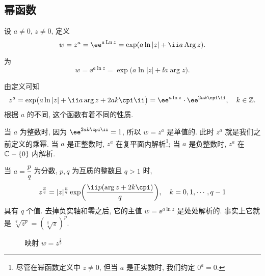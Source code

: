 \subsection{幂函数}
\label{ssec:power-function}

\begin{definition}
  \begin{enuma}
    \item 设 $a\neq 0$, $z\neq 0$, 定义
      \[
        w=z^a=\ee^{a\Ln z}
        =\exp(a\ln|z|+\ii a\Arg z).
      \]
    \item {}为
      \[
        w=\ee^{a\ln z}=\exp\bigl(a\ln|z|+\ii a\arg z\bigr).
      \]
  \end{enuma}
\end{definition}

由定义可知
\[
   z^a
  =\exp\bigl(a\ln|z|+\ii a\arg z+2ak\cpi\ii\bigr)
  =\ee^{a\ln z}\cdot \ee^{2ak\cpi\ii},
    \quad k\in\BZ.
\]
根据 $a$ 的不同, 这个函数有着不同的性质.

当 $a$ 为整数时, 因为 $\ee^{2ak\cpi\ii}=1$, 所以 $w=z^a$ 是单值的. 此时 $z^a$ 就是我们之前定义的乘幂. 
当 $a$ 是正整数时, $z^a$ 在复平面内解析\footnote{%
  尽管在幂函数定义中 $z\neq 0$, 但当 $a$ 是正实数时, 我们约定 $0^a=0$.
};
当 $a$ 是负整数时, $z^a$ 在 ${\mathbb{C}}-{\left\{0\right\}}$ 内解析.

当 $a=\dfrac pq$ 为分数, $p,q$ 为互质的整数且 $q>1$ 时,
\[
   z^{\frac pq}
  =|z|^{\frac pq}\exp\biggl(\frac{\ii p(\arg z+2k\cpi)}q\biggr),
    \quad k=0,1,\cdots,q-1
\]
具有 $q$ 个值.
去掉负实轴和零之后, 它的主值 $w=\ee^{a\ln z}$ 是处处解析的.
事实上它就是 $\sqrt[q]{z^p}=(\sqrt[q]z)^p$.

\begin{figure}[!htb]
  \centering
  \caption{映射 $w=z^{\frac29}$}
\end{figure}

